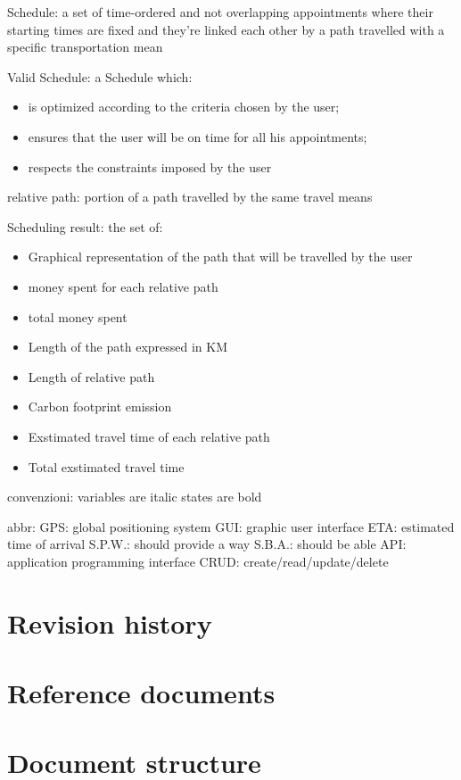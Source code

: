 Schedule: a set of time-ordered and not overlapping appointments where their starting times are fixed and they're linked each other by a path travelled with a specific transportation mean

Valid Schedule: a Schedule which:
\begin{itemize}
\item is optimized according to the criteria chosen by the user;
\item ensures that the user will be on time for all his appointments;
\item respects the constraints imposed by the user
\end{itemize}

relative path: portion of a path travelled by the same travel means 

Scheduling result: the set of:
\begin{itemize}
\item Graphical representation of the path that will be travelled by the user
\item money spent for each relative path
\item total money spent 
\item Length of the path expressed in KM
\item Length of relative path 
\item Carbon footprint emission
\item Exstimated travel time of each relative path
\item Total exstimated travel time
\end{itemize}

convenzioni:
variables are italic
states are bold

abbr:
GPS: global positioning system
GUI: graphic user interface
ETA: estimated time of arrival
S.P.W.: should provide a way
S.B.A.: should be able 
API: application programming interface
CRUD: create/read/update/delete


\section{Revision history}

\section{Reference documents}

\section{Document structure}